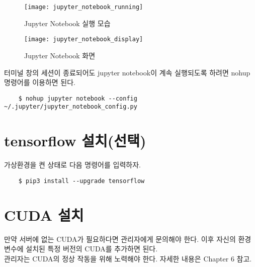 \begin{figure}[H]
	\begin{center}
        \texttt{[image: jupyter\_notebook\_running]}
        \caption{Jupyter Notebook 실행 모습}
    \end{center}
\end{figure}

\begin{figure}[H]
	\begin{center}
        \texttt{[image: jupyter\_notebook\_display]}
        \caption{Jupyter Notebook 화면}
    \end{center}
\end{figure}

터미널 창의 세션이 종료되어도 jupyter notebook이 계속 실행되도록 하려면 nohup 명령어를 이용하면 된다.
\begin{lstlisting}
    $ nohup jupyter notebook --config ~/.jupyter/jupyter_notebook_config.py
\end{lstlisting}
\section{tensorflow 설치(선택)}
가상환경을 켠 상태로 다음 명령어를 입력하자.
\begin{lstlisting}
    $ pip3 install --upgrade tensorflow
\end{lstlisting}
\section{CUDA 설치}
만약 서버에 없는 \acs{CUDA}가 필요하다면 관리자에게 문의해야 한다. 이후 자신의 환경변수에 설치된 특정 버전의 \acs{CUDA}를 추가하면 된다.~\\


관리자는 \acs{CUDA}의 정상 작동을 위해 노력해야 한다. 자세한 내용은 Chapter 6 참고.\\
    
